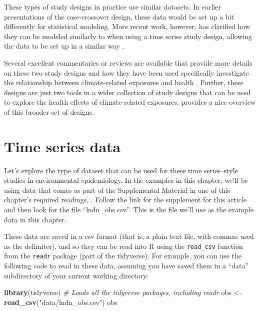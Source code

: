 \documentclass[
]{book}
\newenvironment{Shaded}{\begin{snugshade}}{\end{snugshade}}
\newcommand{\CommentTok}[1]{\textcolor[rgb]{0.56,0.35,0.01}{\textit{#1}}}
\newcommand{\KeywordTok}[1]{\textcolor[rgb]{0.13,0.29,0.53}{\textbf{#1}}}
\newcommand{\NormalTok}[1]{#1}
\newcommand{\StringTok}[1]{\textcolor[rgb]{0.31,0.60,0.02}{#1}}
\begin{document}
These types of study designs in practice use similar datasets. In earlier
presentations of the case-crossover design, these data would be set up a bit
differently for statistical modeling. More recent work, however, has clarified
how they can be modeled similarly to when using a time series study design,
allowing the data to be set up in a similar way \citep{armstrong2014conditional}.

Several excellent commentaries or reviews are available that provide more
details on these two study designs and how they have been used specifically
investigate the relationship between climate-related exposures and health \citep{bhaskaran2013time, armstrong2006models, gasparrini2010time}.
Further, these designs are just two tools in a wider collection of study designs
that can be used to explore the health effects of climate-related exposures.
\citet{dominici2008statistical1} provides a nice overview of this broader set of designs.

\hypertarget{time-series-data}{%
\section{Time series data}\label{time-series-data}}

Let's explore the type of dataset that can be used for these
time series--style studies in environmental epidemiology. In the examples
in this chapter, we'll be using data that comes as part of the Supplemental
Material in one of this chapter's required readings, \citep{vicedo2019hands}.
Follow the link for the supplement for this article and then look for the
file ``lndn\_obs.csv''. This is the file we'll use as the example data in this
chapter.

These data are saved in a csv format (that is, a plain text file, with commas
used as the delimiter), and so they can be read into R using the \texttt{read\_csv}
function from the \texttt{readr} package (part of the tidyverse). For example, you can
use the following code to read in these data, assuming you have saved them in a
``data'' subdirectory of your current working directory:

\begin{Shaded}
\begin{Highlighting}[]
\KeywordTok{library}\NormalTok{(tidyverse) }\CommentTok{# Loads all the tidyverse packages, including readr}
\NormalTok{obs <-}\StringTok{ }\KeywordTok{read_csv}\NormalTok{(}\StringTok{"data/lndn_obs.csv"}\NormalTok{)}
\NormalTok{obs}
\end{Highlighting}
\end{Shaded}
\end{document}
